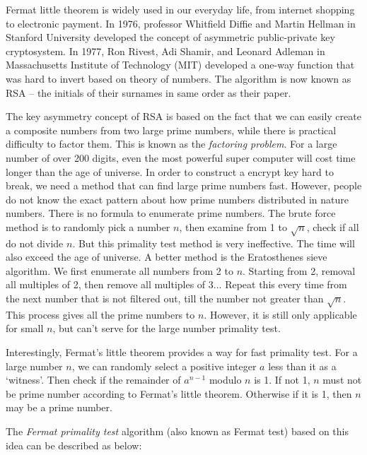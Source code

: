 \documentclass[b5paper]{article}
\begin{document}
\vspace{5mm}


Fermat little theorem is widely used in our everyday life, from internet shopping to electronic payment. In 1976, professor Whitfield Diffie and Martin Hellman in Stanford University developed the concept of asymmetric public-private key cryptosystem. In 1977, Ron Rivest, Adi Shamir, and Leonard Adleman in Massachusetts Institute of Technology (MIT) developed a one-way function that was hard to invert based on theory of numbers. The algorithm is now known as RSA – the initials of their surnames in same order as their paper.

The key asymmetry concept of RSA is based on the fact that we can easily create a composite numbers from two large prime numbers, while there is practical difficulty to factor them. This is known as the {\em factoring problem}. For a large number of over 200 digits, even the most powerful super computer will cost time longer than the age of universe. In order to construct a encrypt key hard to break, we need a method that can find large prime numbers fast. However, people do not know the exact pattern about how prime numbers distributed in nature numbers. There is no formula to enumerate prime numbers. The brute force method is to randomly pick a number $n$, then examine from 1 to $\sqrt{n}$, check if all do not divide $n$. But this primality test method is very ineffective. The time will also exceed the age of universe. A better method is the Eratosthenes sieve algorithm. We first enumerate all numbers from 2 to $n$. Starting from 2, removal all multiples of 2, then remove all multiples of 3... Repeat this every time from the next number that is not filtered out, till the number not greater than $\sqrt{n}$. This process gives all the prime numbers to $n$. However, it is still only applicable for small $n$, but can't serve for the large number primality test.

Interestingly, Fermat's little theorem provides a way for fast primality test. For a large number $n$, we can randomly select a positive integer $a$ less than it as a `witness'. Then check if the remainder of $a^{n-1}$ modulo $n$ is 1. If not 1, $n$ must not be prime number according to Fermat's little theorem. Otherwise if it is 1, then $n$ may be a prime number.

The {\em Fermat primality test} algorithm (also known as Fermat test) based on this idea can be described as below:
\end{document}
